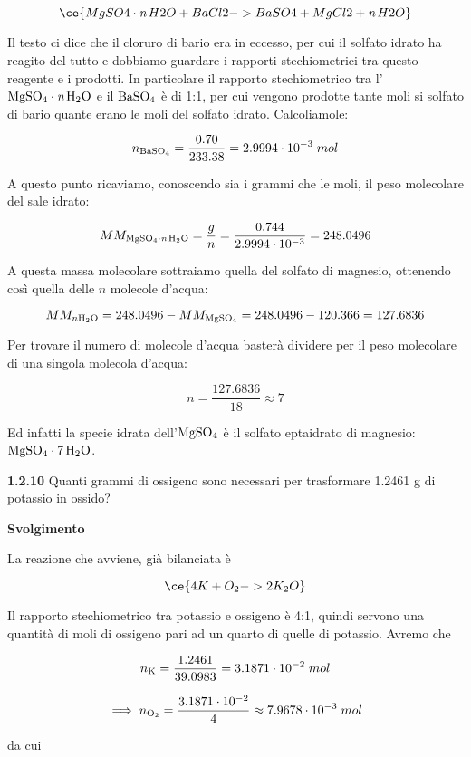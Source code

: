 $$\ce{MgSO4 \cdot \textit{n}\,H2O + BaCl2 -> BaSO4 + MgCl2 + \textit{n}\,H2O}$$

Il testo ci dice che il cloruro di bario era in eccesso, per cui il solfato idrato ha reagito del tutto e dobbiamo guardare i rapporti stechiometrici tra questo reagente e i prodotti. In particolare il rapporto stechiometrico tra l'$\rm MgSO_4 \cdot \textit{n}\,H_2O$ e il $\rm BaSO_4$ è di 1:1, per cui vengono prodotte tante moli si solfato di bario quante erano le moli del solfato idrato. Calcoliamole:

$$n_{\rm BaSO_4}=\frac{0.70}{233.38}
=2.9994 \cdot 10^{-3}\;mol$$

A questo punto ricaviamo, conoscendo sia i grammi che le moli, il peso molecolare del sale idrato:

$$MM_{\rm MgSO_4 \cdot \textit{n}\,H_2O}
=\frac{g}{n}
=\frac{0.744}{2.9994 \cdot 10^{-3}}=248.0496$$

A questa massa molecolare sottraiamo quella del solfato di magnesio, ottenendo così quella delle $n$ molecole d'acqua:

$$MM_{n \rm H_2O}=248.0496 - MM_{\rm MgSO_4}
=248.0496 - 120.366=127.6836$$

Per trovare il numero di molecole d'acqua basterà dividere per il peso molecolare di una singola molecola d'acqua:

$$n=\frac{127.6836}{18} \approx 7$$

Ed infatti la specie idrata dell'$\rm MgSO_4$ è il solfato eptaidrato di magnesio: $\rm MgSO_4 \cdot 7\,H_2O$.

\vspace{0.2cm}\textbf{1.2.10} Quanti grammi di ossigeno sono necessari per trasformare 1.2461 g di potassio in ossido?

\vspace{0.2cm}\large\textbf{Svolgimento}\normalsize

\vspace{0.2cm}La reazione che avviene, già bilanciata è

$$\ce{4K + O_2 -> 2K_2O}$$

Il rapporto stechiometrico tra potassio e ossigeno è 4:1, quindi servono una quantità di moli di ossigeno pari ad un quarto di quelle di potassio. Avremo che

$$n_{\rm K}=\frac{1.2461}{39.0983}=3.1871 \cdot 10^{-2}\;mol$$

$$\implies n_{\rm O_2}
=\frac{3.1871 \cdot 10^{-2}}{4}
\approx 7.9678 \cdot 10^{-3}\;mol$$

da cui

